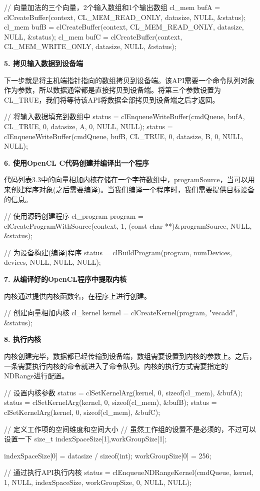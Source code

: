 \begin{codebox}[cpp]
// 向量加法的三个向量，2个输入数组和1个输出数组
cl_mem bufA = clCreateBuffer(context, CL_MEM_READ_ONLY, datasize, NULL, &status);
cl_mem bufB = clCreateBuffer(context, CL_MEM_READ_ONLY, datasize, NULL, &status);
cl_mem bufC = clCreateBuffer(context, CL_MEM_WRITE_ONLY, datasize, NULL, &status);
\end{codebox}

\textbf{5. 拷贝输入数据到设备端}

下一步就是将主机端指针指向的数组拷贝到设备端。该API需要一个命令队列对象作为参数，所以数据通常都是直接拷贝到设备端。将第三个参数设置为CL\_\allowbreak{}TRUE，我们将等待该API将数据全部拷贝到设备端之后才返回。

\begin{codebox}[cpp]
// 将输入数据填充到数组中
status = clEnqueueWriteBuffer(cmdQueue, bufA, CL_TRUE, 0, datasize, A, 0, NULL, NULL);
status = clEnqueueWriteBuffer(cmdQueue, bufB, CL_TRUE, 0, datasize, B, 0, NULL, NULL);
\end{codebox}

\textbf{6. 使用OpenCL C代码创建并编译出一个程序}

代码列表3.3中的向量相加内核存储在一个字符数组中，programSource，当可以用来创建程序对象(之后需要编译)。当我们编译一个程序时，我们需要提供目标设备的信息。

\begin{codebox}[cpp]
// 使用源码创建程序
cl_program program = clCreateProgramWithSource(context, 1, (const char **)&programSource, NULL, &status);

// 为设备构建(编译)程序
status = clBuildProgram(program, numDevices, devices, NULL, NULL, NULL);
\end{codebox}

\textbf{7. 从编译好的OpenCL程序中提取内核}

内核通过提供内核函数名，在程序上进行创建。

\begin{codebox}[cpp]
// 创建向量相加内核
cl_kernel kernel = clCreateKernel(program, "vecadd", &status);
\end{codebox}

\textbf{8. 执行内核}

内核创建完毕，数据都已经传输到设备端，数组需要设置到内核的参数上。之后，一条需要执行内核的命令就进入了命令队列。内核的执行方式需要指定的NDRange进行配置。

\begin{codebox}[cpp]
// 设置内核参数
status = clSetKernelArg(kernel, 0, sizeof(cl_mem), &bufA);
status = clSetKernelArg(kernel, 0, sizeof(cl_mem), &bufB);
status = clSetKernelArg(kernel, 0, sizeof(cl_mem), &bufC);

// 定义工作项的空间维度和空间大小
// 虽然工作组的设置不是必须的，不过可以设置一下
size_t indexSpaceSize[1],workGroupSize[1];

indexSpaceSize[0] = datasize / sizeof(int);
workGroupSize[0] = 256;

// 通过执行API执行内核
status = clEnqueueNDRangeKernel(cmdQueue, kernel, 1, NULL, indexSpaceSize, workGroupSize, 0, NULL, NULL);
\end{codebox}

